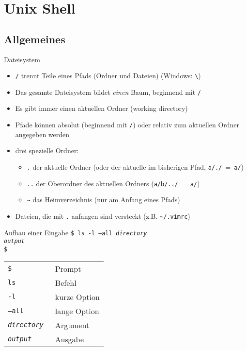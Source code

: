   \section{Unix Shell}
    \subsection{Allgemeines}
      \begin{frame}{Dateisystem}
        \begin{itemize}
          \item \texttt{/} trennt Teile eines Pfads (Ordner und Dateien) (Windows: \texttt{\textbackslash})
          \item Das gesamte Dateisystem bildet \emph{einen} Baum, beginnend mit \texttt{/}
          \item Es gibt immer einen aktuellen Ordner (working directory)
          \item Pfade können absolut (beginnend mit \texttt{/}) oder relativ zum aktuellen Ordner angegeben werden
          \item drei spezielle Ordner:
            \begin{itemize}
              \item \texttt{.} der aktuelle Ordner (oder der aktuelle im bisherigen Pfad, \texttt{a/./}~=~\texttt{a/})
              \item \texttt{..} der Oberordner des aktuellen Ordners (\texttt{a/b/../}~=~\texttt{a/})
              \item \texttt{\textasciitilde} das Heimverzeichnis (nur am Anfang eines Pfads)
            \end{itemize}
          \item Dateien, die mit \texttt{.} anfangen sind versteckt (z.B. \texttt{\textasciitilde/.vimrc})
        \end{itemize}
      \end{frame}

      \begin{frame}{Aufbau einer Eingabe}
        \texttt{\$ ls -l --all \textit{directory}\\
                \textit{output}\\
                \$}
        \begin{center}
          \begin{tabular}{>{\tt}l l}
            \toprule
            \$                 & Prompt       \\
            ls                 & Befehl       \\
            -l                 & kurze Option \\
            --all              & lange Option \\
            \textit{directory} & Argument     \\
            \textit{output}    & Ausgabe      \\
            \bottomrule
          \end{tabular}
        \end{center}
      \end{frame}

